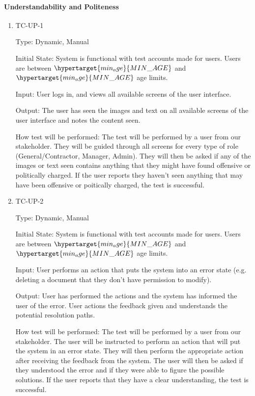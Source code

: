 \documentclass[12pt, titlepage]{article}
\begin{document}
\paragraph{Understandability and Politeness}
\begin{enumerate}
  \item{TC-UP-1\\}

    Type: Dynamic, Manual

    Initial State: System is functional with test accounts made for users. Users
    are between $\hypertarget{min_age}{MIN\_AGE}$ and
    $\hypertarget{min_age}{MIN\_AGE}$ age limits.

    Input: User logs in, and views all available screens of the user interface.

    Output: The user has seen the images and text on all available screens of
    the user interface and notes the content seen.

    How test will be performed: The test will be performed by a user from our
    stakeholder. They will be guided through all screens for every type of role
    (General/Contractor, Manager, Admin). They will then be asked if any of the
    images or text seen contains anything that they might have found offensive
    or politically charged. If the user reports they haven't seen anything that
    may have been offensive or poitically charged, the test is successful.

  \item{TC-UP-2\\}

    Type: Dynamic, Manual

    Initial State: System is functional with test accounts made for users. Users
    are between $\hypertarget{min_age}{MIN\_AGE}$ and
    $\hypertarget{min_age}{MIN\_AGE}$ age limits.

    Input: User performs an action that puts the system into an error state
    (e.g. deleting a document that they don't have permission to modify).

    Output: User has performed the actions and the system has informed the user
    of the error. User actions the feedback given and understands the potential
    resolution paths.

    How test will be performed: The test will be performed by a user from our
    stakeholder. The user will be instructed to perform an action that will put
    the system in an error state. They will then perform the appropriate action
    after receiving the feedback from the system. The user will then be asked if
    they understood the error and if they were able to figure the possible
    solutions. If the user reports that they have a clear understanding, the
    test is successful.

\end{enumerate}
\end{document}
